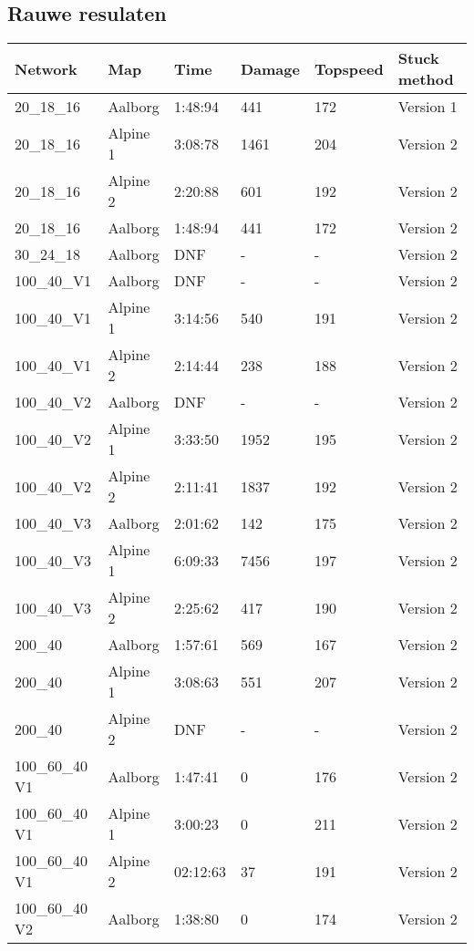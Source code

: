 \documentclass[a4paper,10pt]{scrartcl}
\begin{document}
\subsection*{Rauwe resulaten}
\begin{table}[H]
\begin{tabular}{llllll}
 \textbf{Network} & \textbf{Map} & \textbf{Time} & \textbf{Damage} & \textbf{Topspeed}  & \textbf{Stuck method} \\ \hline
 20\_18\_16  & Aalborg & 1:48:94 & 441 & 172 & Version 1 \\
 20\_18\_16 & Alpine 1 & 3:08:78  & 1461 & 204 & Version 2    \\
 20\_18\_16 & Alpine 2 & 2:20:88  & 601 & 192 & Version 2    \\
 20\_18\_16  & Aalborg & 1:48:94 & 441 & 172 & Version 2 \\ \hline
 30\_24\_18  & Aalborg &  DNF & - & - & Version 2 \\ \hline
 100\_40\_V1 & Aalborg & DNF & - & - & Version 2 \\
 100\_40\_V1 & Alpine 1 & 3:14:56 & 540 & 191 & Version 2 \\
 100\_40\_V1 & Alpine 2 & 2:14:44 & 238 & 188 & Version 2 \\ \hline
 100\_40\_V2 & Aalborg & DNF & - & - & Version 2 \\
 100\_40\_V2 & Alpine 1 & 3:33:50 & 1952 & 195 & Version 2 \\
 100\_40\_V2 & Alpine 2 & 2:11:41 & 1837 & 192 & Version 2 \\ \hline
 100\_40\_V3 & Aalborg & 2:01:62 & 142 & 175 & Version 2 \\
 100\_40\_V3 & Alpine 1 & 6:09:33 & 7456 & 197 & Version 2 \\
 100\_40\_V3 & Alpine 2 & 2:25:62 & 417 & 190 & Version 2 \\ \hline
 200\_40  & Aalborg &  1:57:61 & 569 & 167 & Version 2 \\ 
 200\_40 & Alpine 1 & 3:08:63 & 551 & 207 & Version 2    \\
 200\_40 & Alpine 2 & DNF & - & - & Version 2   \\ \hline 
 100\_60\_40 V1 &  Aalborg & 1:47:41 & 0 & 176 & Version 2 \\
 100\_60\_40 V1 & Alpine 1& 3:00:23 & 0 & 211 & Version 2 \\  
 100\_60\_40 V1 & Alpine 2 & 02:12:63 & 37 & 191 & Version 2   \\ \hline
 100\_60\_40 V2 & Aalborg & 1:38:80  & 0 & 174 & Version 2   \\ 

\end{tabular}
\end{table}
\end{document}
